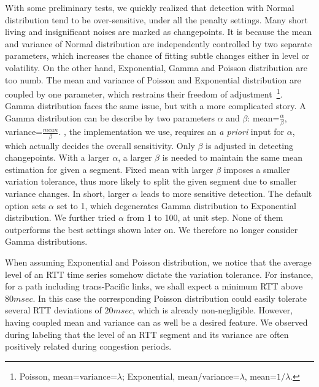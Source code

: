 With some preliminary tests, we quickly realized that detection with Normal distribution tend to be over-sensitive, under all the penalty settings.
Many short living and insignificant noises are marked as changepoints.
It is because the mean and variance of Normal distribution are independently controlled by two separate parameters, which increases the chance of fitting subtle changes either in level or volatility.
On the other hand, Exponential, Gamma and Poisson distribution are too numb.
The mean and variance of Poisson and Exponential distribution are coupled by one parameter,
which restrains their freedom of adjustment~\footnote{Poisson, mean=variance=$\lambda$; Exponential, mean/variance=$\lambda$, mean=$1/\lambda$.}.
Gamma distribution faces the same issue, but with a more complicated story.
A Gamma distribution can be describe by two parameters $\alpha$ and $\beta$: mean=$\frac{\alpha}{\beta}$, variance=$\frac{mean}{\beta}$.
\cite{Killick2013a}, the implementation we use, requires an \textit{a priori} input for $\alpha$, which actually decides the overall sensitivity. 
Only $\beta$ is adjusted in detecting changepoints.
With a larger $\alpha$, a larger $\beta$ is needed to maintain the same mean estimation for given a segment.
Fixed mean with larger $\beta$ imposes a smaller variation tolerance, thus more likely to split the given segment due to smaller variance changes.
In short, larger $\alpha$ leads to more sensitive detection.
The default option sets $\alpha$ set to 1, which degenerates Gamma distribution to Exponential distribution. 
We further tried $\alpha$ from 1 to 100, at unit step. 
None of them outperforms the best settings shown later on. 
We therefore no longer consider Gamma distributions.

When assuming Exponential and Poisson distribution, we notice that the average level of an RTT time series somehow dictate the variation tolerance.
For instance, for a path including trans-Pacific links, we shall expect a minimum RTT above $80msec$.
In this case the corresponding Poisson distribution could easily tolerate several RTT deviations of $20msec$, which is already non-negligible.
However, having coupled mean and variance can as well be a desired feature. 
We observed during labeling that the level of an RTT segment and its variance are often positively related during congestion periods. 

